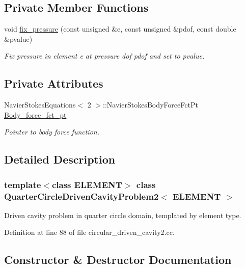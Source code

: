 \subsection*{Private Member Functions}
\begin{DoxyCompactItemize}
\item 
void \hyperlink{classQuarterCircleDrivenCavityProblem2_ae5ce524af511e8399cd5f261afe9331f}{fix\+\_\+pressure} (const unsigned \&e, const unsigned \&pdof, const double \&pvalue)
\begin{DoxyCompactList}\small\item\em Fix pressure in element e at pressure dof pdof and set to pvalue. \end{DoxyCompactList}\end{DoxyCompactItemize}
\subsection*{Private Attributes}
\begin{DoxyCompactItemize}
\item 
Navier\+Stokes\+Equations$<$ 2 $>$\+::Navier\+Stokes\+Body\+Force\+Fct\+Pt \hyperlink{classQuarterCircleDrivenCavityProblem2_ad2b3c4fdc4136aebc331f44cbe13421b}{Body\+\_\+force\+\_\+fct\+\_\+pt}
\begin{DoxyCompactList}\small\item\em Pointer to body force function. \end{DoxyCompactList}\end{DoxyCompactItemize}


\subsection{Detailed Description}
\subsubsection*{template$<$class E\+L\+E\+M\+E\+NT$>$\newline
class Quarter\+Circle\+Driven\+Cavity\+Problem2$<$ E\+L\+E\+M\+E\+N\+T $>$}

Driven cavity problem in quarter circle domain, templated by element type. 

Definition at line 88 of file circular\+\_\+driven\+\_\+cavity2.\+cc.



\subsection{Constructor \& Destructor Documentation}
\mbox{\label{classQuarterCircleDrivenCavityProblem2_a301f6d2c50e2d266126a80956397d78d}} 
